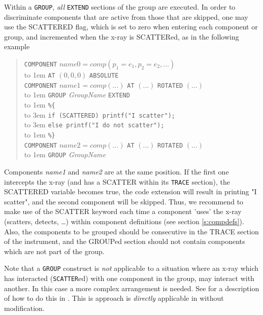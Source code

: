 Within a \texttt{GROUP}, \emph{all} \texttt{EXTEND} sections of the group are executed. In order to discriminate components that are active from those that are skipped, one may use the SCATTERED flag, which is set to zero when entering each component or group, and incremented when the x-ray is SCATTERed, as in the following example  
\begin{quote}
  \texttt{COMPONENT} $\textit{name0} =
    \textit{comp}(p_1 = e_1, p_2 = e_2, \ldots)$ \\
    \hbox to 1em{} \texttt{AT} $(0,0,0)$ \texttt{ABSOLUTE} \\
  \texttt{COMPONENT} $\textit{name1} =
    \textit{comp}(\ldots)$ \texttt{AT} $(...)$  \texttt{ROTATED} $(...)$ \\
  \hbox to 1em{} \texttt{GROUP} \textit{GroupName} \texttt{EXTEND} \\
  \hbox to 1em{} \verb|%{| \\
  \hbox to 3em{} \verb+if (SCATTERED) printf("I scatter");+\\
  \hbox to 3em{} \verb+else printf("I do not scatter");+\\
  \hbox to 1em{} \verb|%}| \\
  \texttt{COMPONENT} $\textit{name2} =
    \textit{comp}(\ldots)$ \texttt{AT} $(...)$ \texttt{ROTATED} $(...)$ \\
  \hbox to 1em{} \texttt{GROUP} \textit{GroupName}
\end{quote}
Components \emph{name1} and \emph{name2} are at the same position. If the first one intercepts the x-ray (and has a SCATTER within its \texttt{TRACE} section), the SCATTERED variable becomes true, the code extension will result in printing "I scatter", and the second component will be skipped.
Thus, we recommend to make use of the SCATTER keyword each time a component 'uses' the x-ray (scatters, detects, \ldots) within component definitions (see section \ref{s:compdefs}). Also, the components to be grouped should be consecutive in the TRACE section of the instrument, and the GROUPed section should not contain components which are not part of the group.

Note that a \texttt{GROUP} construct is \emph{not} applicable to a situation where an x-ray which has interacted (\texttt{SCATTER}ed) with one component in the group, may interact
with another. In this case a more complex arrangement is needed. See \cite{willendrup2011using} for a description of how to do this in \MCS. This is approach is \emph{directly} applicable in \MCX without modification. 

